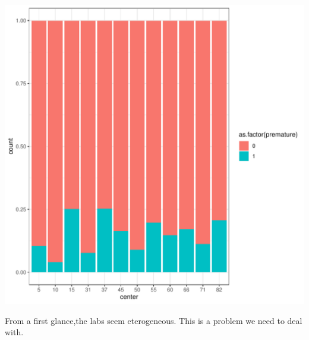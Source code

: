 \documentclass{article}\usepackage[]{graphicx}\usepackage[]{color}
\makeatletter
\def\maxwidth{ %
  \ifdim\Gin@nat@width>\linewidth
    \linewidth
  \else
    \Gin@nat@width
  \fi
}
\newenvironment{knitrout}{}{} %
\makeatother
\begin{document}
\begin{knitrout}
\includegraphics[width=\maxwidth]{figure/unnamed-chunk-14-2} 

\end{knitrout}
From a first glance,the labs seem eterogeneous. This is a problem we need to deal with. 
\end{document}

